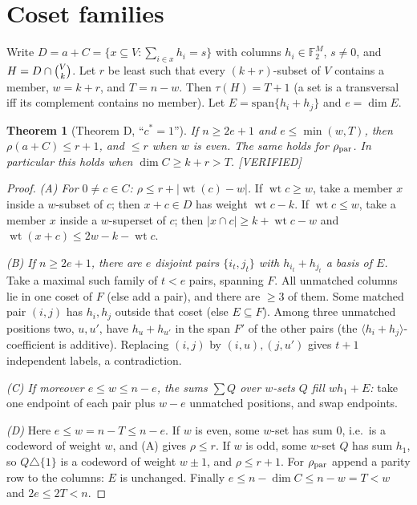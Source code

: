 \documentclass[11pt]{article}
\newtheorem{theorem}{Theorem}[section]
\theoremstyle{definition}
\newcommand{\st}[1]{\textsf{\small[#1]}}
\newcommand{\F}{\mathbb{F}_2}
\newcommand{\wt}{\operatorname{wt}}
\newcommand{\binomV}[1]{\tbinom{V}{#1}}
\begin{document}
\section{Coset families}\label{sec:coset}

Write $D=a+C=\{x\subseteq V:\sum_{i\in x}h_i=s\}$ with columns $h_i\in\F^M$, $s\ne0$, and $H=D\cap\binomV k$. Let
$r$ be least such that every $(k+r)$-subset of $V$ contains a member, $w=k+r$, and $T=n-w$. Then $\tau(H)=T+1$ (a set
is a transversal iff its complement contains no member). Let $E=\mathrm{span}\{h_i+h_j\}$ and $e=\dim E$.

\begin{theorem}[Theorem D, ``$c^*=1$'']\label{thm:D}
If $n\ge2e+1$ and $e\le\min(w,T)$, then $\rho(a+C)\le r+1$, and $\le r$ when $w$ is even. The same holds for
$\rho_{\rm par}$. In particular this holds when $\dim C\ge k+r>T$. \st{VERIFIED}
\end{theorem}
\begin{proof}
\emph{(A) For $0\ne c\in C$: $\rho\le r+|\wt(c)-w|$.} If $\wt c\ge w$, take a member $x$ inside a $w$-subset of $c$;
then $x+c\in D$ has weight $\wt c-k$. If $\wt c\le w$, take a member $x$ inside a $w$-superset of $c$; then
$|x\cap c|\ge k+\wt c-w$ and $\wt(x+c)\le2w-k-\wt c$.

\emph{(B) If $n\ge2e+1$, there are $e$ disjoint pairs $\{i_t,j_t\}$ with $h_{i_t}+h_{j_t}$ a basis of $E$.} Take a
maximal such family of $t<e$ pairs, spanning $F$. All unmatched columns lie in one coset of $F$ (else add a pair), and
there are $\ge3$ of them. Some matched pair $(i,j)$ has $h_i,h_j$ outside that coset (else $E\subseteq F$). Among
three unmatched positions two, $u,u'$, have $h_u+h_{u'}$ in the span $F'$ of the other pairs (the
$\langle h_i+h_j\rangle$-coefficient is additive). Replacing $(i,j)$ by $(i,u),(j,u')$ gives $t+1$ independent labels, a
contradiction.

\emph{(C) If moreover $e\le w\le n-e$, the sums $\sum Q$ over $w$-sets $Q$ fill $w h_1+E$:} take one endpoint of each
pair plus $w-e$ unmatched positions, and swap endpoints.

\emph{(D)} Here $e\le w=n-T\le n-e$. If $w$ is even, some $w$-set has sum $0$, i.e.\ is a codeword of weight $w$, and
(A) gives $\rho\le r$. If $w$ is odd, some $w$-set $Q$ has sum $h_1$, so $Q\triangle\{1\}$ is a codeword of weight
$w\pm1$, and $\rho\le r+1$. For $\rho_{\rm par}$ append a parity row to the columns: $E$ is unchanged. Finally
$e\le n-\dim C\le n-w=T<w$ and $2e\le2T<n$.
\end{proof}
\end{document}
